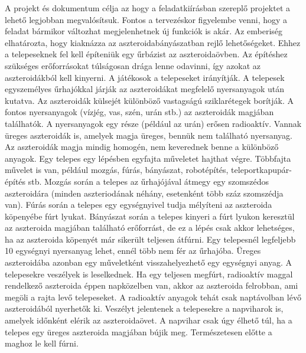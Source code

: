 \markdownRendererInterblockSeparator
{}A projekt és dokumentum célja az hogy a feladatkiírásban szereplő projektet a lehető legjobban megvalósítsuk. Fontos a tervezéskor figyelembe venni, hogy a feladat bármikor változhat megjelenhetnek új funkciók is akár.\markdownRendererInterblockSeparator
{}\markdownRendererInterblockSeparator
{}\markdownRendererInterblockSeparator
{}Az emberiség elhatározta, hogy kiaknázza az aszteroidabányászatban rejlő lehetőségeket. Ehhez a telepeseknek fel kell építeniük egy űrbázist az aszteroidaövben. Az építéshez szükséges erőforrásokat túlságosan drága lenne odavinni, így azokat az aszteroidákból kell kinyerni.\markdownRendererInterblockSeparator
{}A játékosok a telepeseket irányítják. A telepesek egyszemélyes űrhajókkal járják az aszteroidákat megfelelő nyersanyagok után kutatva.\markdownRendererInterblockSeparator
{}Az aszteroidák külsejét különböző vastagságú sziklarétegek borítják. A fontos nyersanyagok (vízjég, vas, szén, urán stb.) az aszteroidák magjában találhatók. A nyersanyagok egy része (például az urán) erősen radioaktív. Vannak üreges aszteroidák is, amelyek magja üreges, bennük nem található nyersanyag. Az aszteroidák magja mindig homogén, nem keverednek benne a különböző anyagok.\markdownRendererInterblockSeparator
{}Egy telepes egy lépésben egyfajta műveletet hajthat végre. Többfajta művelet is van, például mozgás, fúrás, bányászat, robotépítés, teleportkapupár-építés stb. Mozgás során a telepes az űrhajójával átmegy egy szomszédos aszteroidára (minden aszteriodának néhány, esetenként több száz szomszédja van). Fúrás során a telepes egy egységnyivel tudja mélyíteni az aszteroida köpenyébe fúrt lyukat. Bányászat során a telepes kinyeri a fúrt lyukon keresztül az aszteroida magjában található erőforrást, de ez a lépés csak akkor lehetséges, ha az aszteroida köpenyét már sikerült teljesen átfúrni. Egy telepesnél legfeljebb 10 egységnyi nyersanyag lehet, ennél több nem fér az űrhajóba. Üreges aszteroidába azonban egy műveletként visszahelyezhető egy egységnyi anyag.\markdownRendererInterblockSeparator
{}A telepesekre veszélyek is leselkednek. Ha egy teljesen megfúrt, radioaktív maggal rendelkező aszteroida éppen napközelben van, akkor az aszteroida felrobban, ami megöli a rajta levő telepeseket. A radioaktív anyagok tehát csak naptávolban lévő aszteroidából nyerhetők ki. Veszélyt jelentenek a telepesekre a napviharok is, amelyek időnként elérik az aszteroidaövet. A napvihar csak úgy élhető túl, ha a telepes egy üreges aszteroida magjában bújik meg. Természetesen előtte a maghoz le kell fúrni.\markdownRendererInterblockSeparator
